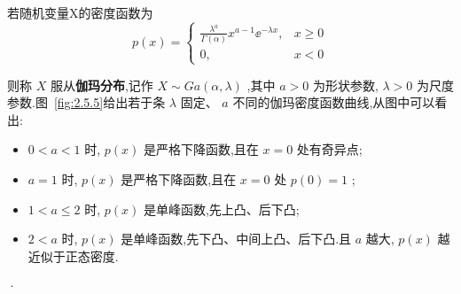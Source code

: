 若随机变量X的密度函数为
\begin{equation}
p(x)=\left\{\begin{array}{ll}{\frac{\lambda^{a}}{\Gamma(\alpha)} x^{a-1} \ee ^{-\lambda x},} & {x \geqslant 0} \\ {0,} & {x<0}\end{array}\right. \label{eq:2.5.12}
\end{equation}

则称 $ X $ 服从\textbf{伽玛分布},记作 $ X \sim G a(\alpha, \lambda) $ ,其中 $ a>0 $ 为形状参数, $ \lambda>0 $ 为尺度参数.图~\ref{fig:2.5.5}给出若于条 $ \lambda $ 固定、 $ a $ 不同的伽玛密度函数曲线,从图中可以看出:

\begin{itemize}
	\item $ 0<a<1 $ 时, $ p(x) $ 是严格下降函数,且在 $ x=0 $ 处有奇异点;
	\item $ a=1 $ 时, $ p(x) $ 是严格下降函数,且在 $ x=0 $ 处 $ p(0)=1 $ ;
	\item $ 1<a \leq 2 $ 时, $ p(x) $ 是单峰函数,先上凸、后下凸;
	\item $ 2<a $ 时, $ p(x) $ 是单峰函数,先下凸、中间上凸、后下凸.且 $ a $ 越大, $ p(x) $ 越近似于正态密度.
\end{itemize}
·
